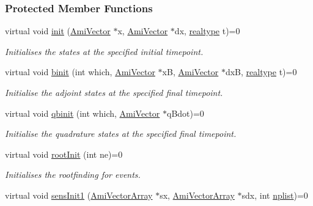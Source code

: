 \subsubsection*{Protected Member Functions}
\begin{DoxyCompactItemize}
\item 
virtual void \mbox{\hyperlink{classamici_1_1_solver_a566d267fa2815fe0dd3c29d44f68209b}{init}} (\mbox{\hyperlink{classamici_1_1_ami_vector}{Ami\+Vector}} $\ast$x, \mbox{\hyperlink{classamici_1_1_ami_vector}{Ami\+Vector}} $\ast$dx, \mbox{\hyperlink{namespaceamici_a1bdce28051d6a53868f7ccbf5f2c14a3}{realtype}} t)=0
\begin{DoxyCompactList}\small\item\em Initialises the states at the specified initial timepoint. \end{DoxyCompactList}\item 
virtual void \mbox{\hyperlink{classamici_1_1_solver_a14a9fe177339143801b38baeb800317a}{binit}} (int which, \mbox{\hyperlink{classamici_1_1_ami_vector}{Ami\+Vector}} $\ast$xB, \mbox{\hyperlink{classamici_1_1_ami_vector}{Ami\+Vector}} $\ast$dxB, \mbox{\hyperlink{namespaceamici_a1bdce28051d6a53868f7ccbf5f2c14a3}{realtype}} t)=0
\begin{DoxyCompactList}\small\item\em Initialise the adjoint states at the specified final timepoint. \end{DoxyCompactList}\item 
virtual void \mbox{\hyperlink{classamici_1_1_solver_a57c1900d556ab878f5fad94b4fcd1abd}{qbinit}} (int which, \mbox{\hyperlink{classamici_1_1_ami_vector}{Ami\+Vector}} $\ast$q\+Bdot)=0
\begin{DoxyCompactList}\small\item\em Initialise the quadrature states at the specified final timepoint. \end{DoxyCompactList}\item 
virtual void \mbox{\hyperlink{classamici_1_1_solver_a0bb31b3b358751d4447199e2732db932}{root\+Init}} (int ne)=0
\begin{DoxyCompactList}\small\item\em Initialises the rootfinding for events. \end{DoxyCompactList}\item 
virtual void \mbox{\hyperlink{classamici_1_1_solver_a9e5cc83868435443926cde99c1a1d864}{sens\+Init1}} (\mbox{\hyperlink{classamici_1_1_ami_vector_array}{Ami\+Vector\+Array}} $\ast$sx, \mbox{\hyperlink{classamici_1_1_ami_vector_array}{Ami\+Vector\+Array}} $\ast$sdx, int \mbox{\hyperlink{classamici_1_1_solver_a9a135f04f34dbf45cf980b97e6906665}{nplist}})=0

\end{DoxyCompactItemize}
